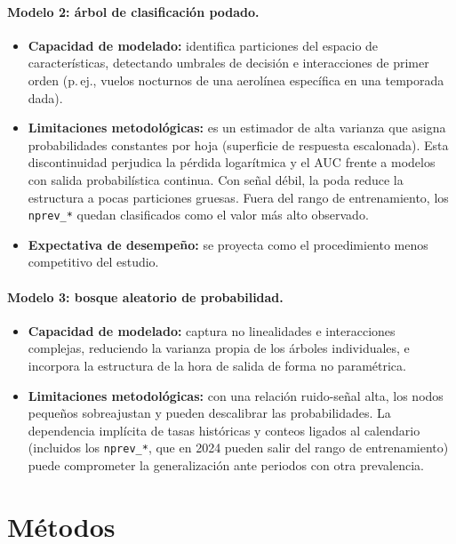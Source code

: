 \documentclass[11pt,a4paper]{article}
\begin{document}
\paragraph{Modelo 2: árbol de clasificación podado.}
\begin{itemize}
  \item \textbf{Capacidad de modelado:} identifica particiones del espacio de características, detectando umbrales de decisión e interacciones de primer orden (p.\,ej., vuelos nocturnos de una aerolínea específica en una temporada dada).
  \item \textbf{Limitaciones metodológicas:} es un estimador de alta varianza que asigna probabilidades constantes por hoja (superficie de respuesta escalonada). Esta discontinuidad perjudica la pérdida logarítmica y el AUC frente a modelos con salida probabilística continua. Con señal débil, la poda reduce la estructura a pocas particiones gruesas. Fuera del rango de entrenamiento, los \texttt{nprev\_*} quedan clasificados como el valor más alto observado.
  \item \textbf{Expectativa de desempeño:} se proyecta como el procedimiento menos competitivo del estudio.
\end{itemize}
 
\paragraph{Modelo 3: bosque aleatorio de probabilidad.}
\begin{itemize}
  \item \textbf{Capacidad de modelado:} captura no linealidades e interacciones complejas, reduciendo la varianza propia de los árboles individuales, e incorpora la estructura de la hora de salida de forma no paramétrica.
  \item \textbf{Limitaciones metodológicas:} con una relación ruido-señal alta, los nodos pequeños sobreajustan y pueden descalibrar las probabilidades. La dependencia implícita de tasas históricas y conteos ligados al calendario (incluidos los \texttt{nprev\_*}, que en 2024 pueden salir del rango de entrenamiento) puede comprometer la generalización ante periodos con otra prevalencia.
\end{itemize}
 
 
\section{Métodos}\label{sec:metodos}
 
\end{document}
